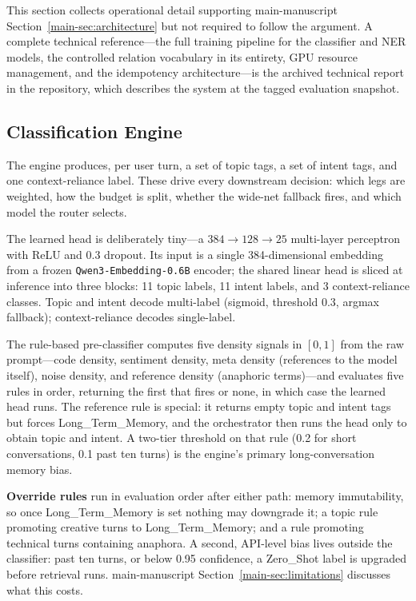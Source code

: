 \documentclass[twoside,11pt]{article}
\begin{document}
This section collects operational detail supporting main-manuscript Section~\ref{main-sec:architecture} but not required to follow the argument. A complete technical reference---the full training pipeline for the classifier and NER models, the controlled relation vocabulary in its entirety, GPU resource management, and the idempotency architecture---is the archived technical report in the repository, which describes the system at the tagged evaluation snapshot.

\subsection{Classification Engine}
\label{app:classifier}

The engine produces, per user turn, a set of topic tags, a set of intent tags, and one context-reliance label. These drive every downstream decision: which legs are weighted, how the budget is split, whether the wide-net fallback fires, and which model the router selects.

The learned head is deliberately tiny---a $384 \rightarrow 128 \rightarrow 25$ multi-layer perceptron with ReLU and 0.3 dropout. Its input is a single 384-dimensional embedding from a frozen \texttt{Qwen3-Embedding-0.6B} encoder; the shared linear head is sliced at inference into three blocks: 11 topic labels, 11 intent labels, and 3 context-reliance classes. Topic and intent decode multi-label (sigmoid, threshold 0.3, argmax fallback); context-reliance decodes single-label.

The rule-based pre-classifier computes five density signals in $[0,1]$ from the raw prompt---code density, sentiment density, meta density (references to the model itself), noise density, and reference density (anaphoric terms)---and evaluates five rules in order, returning the first that fires or none, in which case the learned head runs. The reference rule is special: it returns empty topic and intent tags but forces Long\_Term\_Memory, and the orchestrator then runs the head only to obtain topic and intent. A two-tier threshold on that rule (0.2 for short conversations, 0.1 past ten turns) is the engine's primary long-conversation memory bias.

\textbf{Override rules} run in evaluation order after either path: memory immutability, so once Long\_Term\_Memory is set nothing may downgrade it; a topic rule promoting creative turns to Long\_Term\_Memory; and a rule promoting technical turns containing anaphora. A second, API-level bias lives outside the classifier: past ten turns, or below 0.95 confidence, a Zero\_Shot label is upgraded before retrieval runs. main-manuscript Section~\ref{main-sec:limitations} discusses what this costs.
\end{document}
